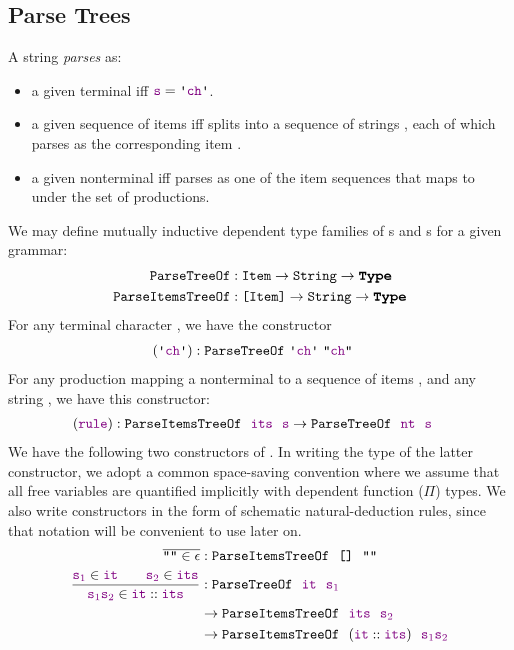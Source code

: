   \subsection{Parse Trees} \label{sec:formal-parse-tree-definition}
    A string  \emph{parses} as:
    \begin{itemize}
      \item a given terminal  iff $\farg{s} = \terminal{\farg{ch}}$.
      \item a given sequence of items  iff  splits into a sequence of strings , each of which parses as the corresponding item .
      \item a given nonterminal  iff  parses as one of the item sequences that  maps to under the set of productions.
    \end{itemize}

    We may define mutually inductive dependent type families of s and s for a given grammar:
    \begin{align*}
      \indname{ParseTreeOf} & \oftypesep \indname{Item} \typeto \String \typeto \Type \\
      \indname{ParseItemsTreeOf} & \oftypesep \typelist{\indname{Item}} \typeto \String \typeto \Type
    \end{align*}
    For any terminal character , we have the constructor
    \begin{align*}
      (\terminal{\farg{ch}}) & \oftypesep \indname{ParseTreeOf}~\terminal{\farg{ch}}~\str{\farg{ch}}
    \end{align*}
    For any production  mapping a nonterminal  to a sequence of items , and any string , we have this constructor:
    \begin{align*}
      & (\textcolor{violet}{\texttt{rule}}) : \texttt{ParseItemsTreeOf}~~\textcolor{violet}{\texttt{its}}~~\textcolor{violet}{\texttt{s}} \to \texttt{ParseTreeOf}~~\textcolor{violet}{\texttt{nt}}~~\textcolor{violet}{\texttt{s}}
    \end{align*}
    We have the following two constructors of .  In writing the type of the latter constructor, we adopt a common space-saving convention where we assume that all free variables are quantified implicitly with dependent function ($\Pi$) types.  We also write constructors in the form of schematic natural-deduction rules, since that notation will be convenient to use later on.
    \begin{align*}
      \overline{\str{}\in\epsilon} & \oftypesep \indname{ParseItemsTreeOf}~~\nil~~\str{} \\
      \frac{\farg{s$_1$}\in \farg{it}\qquad \farg{s$_2$}\in \farg{its}}{\strcat{\farg{s$_1$}}{\farg{s$_2$}}\in \cons{\farg{it}}{\farg{its}}} & \oftypesep \indname{ParseTreeOf}~~\farg{it}~~\farg{s$_1$} \\
      & \typeto \indname{ParseItemsTreeOf}~~\farg{its}~~\farg{s$_2$} \\
      & \typeto
      \indname{ParseItemsTreeOf}~~(\cons{\farg{it}}{\farg{its}})~~\strcat{\farg{s$_1$}}{\farg{s$_2$}}
    \end{align*}

